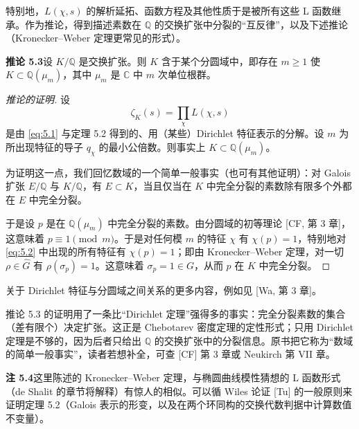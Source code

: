 特别地，$L(\chi,s)$ 的解析延拓、函数方程及其他性质于是被所有这些 L 函数继承。作为推论，得到描述素数在 $\mathbb{Q}$ 的交换扩张中分裂的“互反律”，以及下述推论（Kronecker--Weber 定理更常见的形式）。

\par\medskip\noindent\textbf{推论 5.3}\quad 设 $K/\mathbb{Q}$ 是交换扩张。则 $K$ 含于某个分圆域中，即存在 $m\ge 1$ 使 $K\subset\mathbb{Q}(\mu_m)$，其中 $\mu_m$ 是 $\mathbb{C}$ 中 $m$ 次单位根群。

\begin{proof}[推论的证明]
设
\begin{equation}\tag{5.2}\label{eq:5.2}
\zeta_K(s)=\prod_{\chi}L(\chi,s)
\end{equation}
是由 \eqref{eq:5.1} 与定理 5.2 得到的、用（某些）Dirichlet 特征表示的分解。设 $m$ 为所出现特征的导子 $q_{\chi}$ 的最小公倍数。则事实上 $K\subset\mathbb{Q}(\mu_m)$。

为证明这一点，我们回忆数域的一个简单一般事实（也可有其他证明）：对 Galois 扩张 $E/\mathbb{Q}$ 与 $K/\mathbb{Q}$，有 $E\subset K$，当且仅当在 $K$ 中完全分裂的素数除有限多个外都在 $E$ 中完全分裂。

于是设 $p$ 是在 $\mathbb{Q}(\mu_m)$ 中完全分裂的素数。由分圆域的初等理论 [CF, 第 3 章]，这意味着 $p\equiv 1\pmod m$。于是对任何模 $m$ 的特征 $\chi$ 有 $\chi(p)=1$，特别地对 \eqref{eq:5.2} 中出现的所有特征有 $\chi(p)=1$；即由 Kronecker--Weber 定理，对一切 $\rho\in\widehat{G}$ 有 $\rho(\sigma_p)=1$。这意味着 $\sigma_p=1\in G$，从而 $p$ 在 $K$ 中完全分裂。
\end{proof}

关于 Dirichlet 特征与分圆域之间关系的更多内容，例如见 [Wa, 第 3 章]。

\begin{annote}
推论 5.3 的证明用了一条比“Dirichlet 定理”强得多的事实：完全分裂素数的集合（差有限个）决定扩张。这正是 Chebotarev 密度定理的定性形式；只用 Dirichlet 定理是不够的，因为后者只给出 $\mathbb{Q}$ 的交换扩张中的分裂信息。原书把它称为“数域的简单一般事实”，读者若想补全，可查 [CF] 第 3 章或 Neukirch 第 VII 章。
\par\vspace{0.15em}{\raggedleft 【来源：Cassels--Fröhlich《Algebraic Number Theory》Ch.~3（A）；Neukirch《Algebraic Number Theory》Ch.~VII（A）】\par}
\end{annote}

\par\medskip\noindent\textbf{注 5.4}\quad 这里陈述的 Kronecker--Weber 定理，与椭圆曲线模性猜想的 L 函数形式（de Shalit 的章节将解释）有惊人的相似。可以循 Wiles 论证 [Tu] 的一般原则来证明定理 5.2（Galois 表示的形变，以及在两个环同构的交换代数判据中计算数值不变量）。


